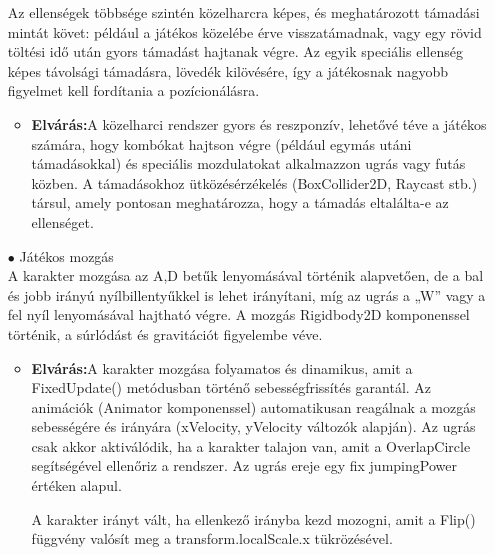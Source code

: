 \documentclass[
]{thesis-ekf}
\theoremstyle{definition}
\theoremstyle{remark}
\begin{document}
\begin{itemize}
	Az ellenségek többsége szintén közelharcra képes, és meghatározott támadási mintát követ: például a játékos közelébe érve visszatámadnak, vagy egy rövid töltési idő után gyors támadást hajtanak végre. Az egyik speciális ellenség képes távolsági támadásra, lövedék kilövésére, így a játékosnak nagyobb figyelmet kell fordítania a pozícionálásra.
	\begin{itemize}
		\item \textbf{Elvárás:}A közelharci rendszer gyors és reszponzív, lehetővé téve a játékos számára, hogy kombókat hajtson végre (például egymás utáni támadásokkal) és speciális mozdulatokat alkalmazzon ugrás vagy futás közben. A támadásokhoz ütközésérzékelés (BoxCollider2D, Raycast stb.) társul, amely pontosan meghatározza, hogy a támadás eltalálta-e az ellenséget.
	\end{itemize}
	\item[$\bullet$] Játékos mozgás\\A karakter mozgása az A,D betűk lenyomásával történik alapvetően, de a bal és jobb irányú nyílbillentyűkkel is lehet irányítani, míg az ugrás a „W” vagy a fel nyíl lenyomásával hajtható végre. A mozgás Rigidbody2D komponenssel történik, a súrlódást és gravitációt figyelembe véve.
	\begin{itemize}
		\item \textbf{Elvárás:}A karakter mozgása folyamatos és dinamikus, amit a FixedUpdate() metódusban történő sebességfrissítés garantál. Az animációk (Animator komponenssel) automatikusan reagálnak a mozgás sebességére és irányára (xVelocity, yVelocity változók alapján).
		Az ugrás csak akkor aktiválódik, ha a karakter talajon van, amit a OverlapCircle segítségével ellenőriz a rendszer. Az ugrás ereje egy fix jumpingPower értéken alapul.
		
		A karakter irányt vált, ha ellenkező irányba kezd mozogni, amit a Flip() függvény valósít meg a transform.localScale.x tükrözésével.
	\end{itemize}
\end{itemize}
\end{document}
